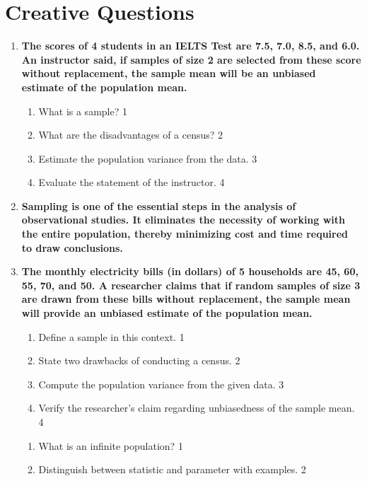 \documentclass[a4paper,oneside, margin=1.4in]{book}
\begin{document}
\section{Creative Questions}
  \begin{enumerate}
  
   \item
  \textbf{The scores of 4 students in an IELTS Test are 7.5, 7.0, 8.5, and 6.0. An instructor said, if samples of size 2 are selected from these score without replacement, the sample mean will be an unbiased estimate of the population mean.}

  
  \begin{enumerate}
    \item
	What is a sample? \hfill 1
    \item
	What are the disadvantages of a census? \hfill 2
    \item  
	Estimate the population variance from the data. \hfill 3
    \item
	Evaluate the statement of the instructor. \hfill 4
  \end{enumerate}
  
  
 \item
  \textbf{Sampling is one of the essential steps in the analysis of observational studies. It eliminates the necessity of working with the entire population, thereby minimizing cost and time required to draw conclusions.}

\item
  \textbf{The monthly electricity bills (in dollars) of 5 households are 45, 60, 55, 70, and 50. A researcher claims that if random samples of size 3 are drawn from these bills without replacement, the sample mean will provide an unbiased estimate of the population mean.}

  
  \begin{enumerate}
    \item
    Define a sample in this context. \hfill 1
    \item
    State two drawbacks of conducting a census. \hfill 2
    \item  
    Compute the population variance from the given data. \hfill 3
    \item
    Verify the researcher's claim regarding unbiasedness of the sample mean. \hfill 4
  \end{enumerate}
  
  \begin{enumerate}
    \item
	What is an infinite population? \hfill 1
    \item
	Distinguish between statistic and parameter with examples. \hfill 2


\end{enumerate}
\end{enumerate}
\end{document}
